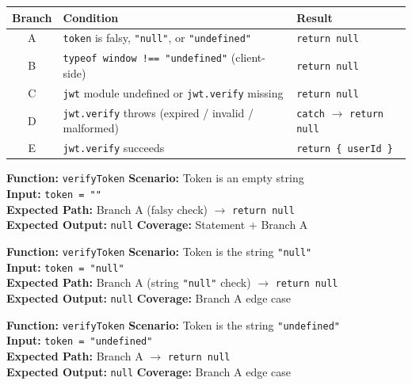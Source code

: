 ﻿\documentclass[12pt,a4paper]{report}
\newcommand{\pone}{\textbf{\color{p1red}P1}}
\begin{document}
\begin{center}
\begin{tabular}{clp{7cm}}
  \toprule
  \textbf{Branch} & \textbf{Condition} & \textbf{Result} \\
  \midrule
  A & \texttt{token} is falsy, \texttt{"null"}, or \texttt{"undefined"} & \texttt{return null} \\
  B & \texttt{typeof window !== "undefined"} (client-side) & \texttt{return null} \\
  C & \texttt{jwt} module undefined or \texttt{jwt.verify} missing & \texttt{return null} \\
  D & \texttt{jwt.verify} throws (expired / invalid / malformed) & \texttt{catch} $\to$ \texttt{return null} \\
  E & \texttt{jwt.verify} succeeds & \texttt{return \{ userId \}} \\
  \bottomrule
\end{tabular}
\end{center}

\begin{tcolorbox}[testbox,title={AUTH-001 \hfill \pone}]
\textbf{Function:} \texttt{verifyToken} \quad \textbf{Scenario:} Token is an empty string \\
\textbf{Input:} \texttt{token = ""} \\
\textbf{Expected Path:} Branch A (falsy check) $\to$ \texttt{return null} \\
\textbf{Expected Output:} \texttt{null} \quad \textbf{Coverage:} Statement + Branch A
\end{tcolorbox}

\begin{tcolorbox}[testbox,title={AUTH-002 \hfill \pone}]
\textbf{Function:} \texttt{verifyToken} \quad \textbf{Scenario:} Token is the string \texttt{"null"} \\
\textbf{Input:} \texttt{token = "null"} \\
\textbf{Expected Path:} Branch A (string \texttt{"null"} check) $\to$ \texttt{return null} \\
\textbf{Expected Output:} \texttt{null} \quad \textbf{Coverage:} Branch A edge case
\end{tcolorbox}

\begin{tcolorbox}[testbox,title={AUTH-003 \hfill \pone}]
\textbf{Function:} \texttt{verifyToken} \quad \textbf{Scenario:} Token is the string \texttt{"undefined"} \\
\textbf{Input:} \texttt{token = "undefined"} \\
\textbf{Expected Path:} Branch A $\to$ \texttt{return null} \\
\textbf{Expected Output:} \texttt{null} \quad \textbf{Coverage:} Branch A edge case
\end{tcolorbox}
\end{document}
